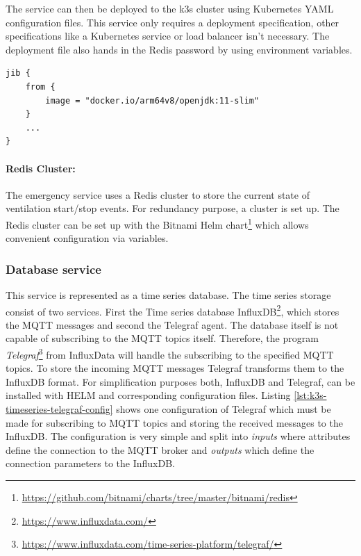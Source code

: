 \bigskip
The service can then be deployed to the k3s cluster using Kubernetes YAML configuration files. This service only requires a deployment specification, other specifications like a Kubernetes service or load balancer isn't necessary. The deployment file also hands in the Redis password by using environment variables.

\begin{lstlisting}[caption={Build emergency container image for ARM with Jib.},label={lst:k3s-emergency-service-build-gradle},captionpos=b]
jib {
    from {
        image = "docker.io/arm64v8/openjdk:11-slim"
    }
    ...
}
\end{lstlisting}

\paragraph{Redis Cluster:}
The emergency service uses a Redis cluster to store the current state of ventilation start/stop events. For redundancy purpose, a cluster is set up. The Redis cluster can be set up with the Bitnami Helm chart\footnote{\url{https://github.com/bitnami/charts/tree/master/bitnami/redis}} which allows convenient configuration via variables.
    
\subsubsection*{Database service}\label{subsubsec:k3s-database-service}
This service is represented as a time series database. The time series storage consist of two services. First the Time series database InfluxDB\footnote{\url{https://www.influxdata.com/}}, which stores the MQTT messages and second the Telegraf agent. The database itself is not capable of subscribing to the MQTT topics itself. Therefore, the program \textit{Telegraf}\footnote{\url{https://www.influxdata.com/time-series-platform/telegraf/}} from InfluxData will handle the subscribing to the specified MQTT topics. To store the incoming MQTT messages Telegraf transforms them to the InfluxDB format. For simplification purposes both, InfluxDB and Telegraf, can be installed with HELM and corresponding configuration files. Listing \ref{lst:k3s-timeseries-telegraf-config} shows one configuration of Telegraf which must be made for subscribing to MQTT topics and storing the received messages to the InfluxDB. The configuration is very simple and split into \textit{inputs} where attributes define the connection to the MQTT broker and \textit{outputs} which define the connection parameters to the InfluxDB.


